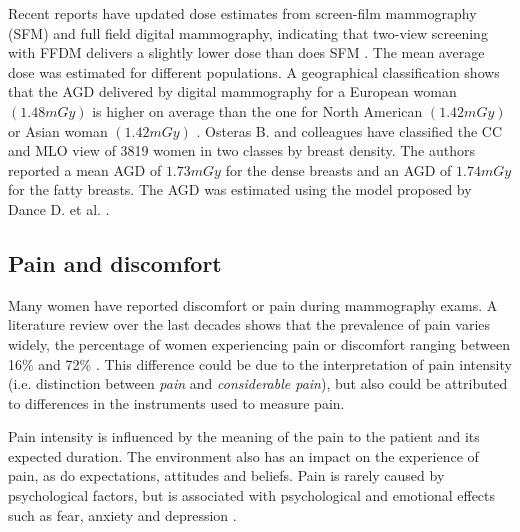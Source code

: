 Recent reports have updated dose estimates from screen-film mammography (SFM) and full field digital mammography, indicating that two-view screening with FFDM delivers a slightly lower dose than does SFM . The mean average dose was estimated for different populations. A geographical classification shows that the AGD delivered by digital mammography for a European woman  $(1.48 mGy)$ is higher on average than the one for North American $(1.42 mGy)$ or Asian woman $(1.42 mGy)$ \citep{geeraert_breast_2012}. Osteras B. and colleagues \cite{osteraas_average_2018} have classified the CC and MLO view of 3819 women in two classes by breast density. The authors reported a mean AGD of $1.73 mGy$ for the dense breasts and an AGD of $1.74 mGy$ for the fatty breasts. The AGD was estimated using the model proposed by Dance D. et al. \cite{dance_additional_2000} .  


\subsection{Pain and discomfort}
Many women have reported discomfort or pain during mammography exams. A literature review over the last decades shows that the  prevalence of pain varies widely, the percentage of women experiencing pain or discomfort ranging between 16\% and 72\% \citep{keemers_pain_2000, peipins_impact_2006,dullum_rates_2000, whelehan_effect_2013}. This difference could be due to the interpretation of pain intensity (i.e. distinction between \textit{pain} and \textit{considerable pain}),  but also could be attributed to differences in the instruments used to measure pain. 

Pain intensity is influenced by the meaning of the pain to the patient and its expected duration. The environment also has an impact on the experience of pain, as do expectations, attitudes and beliefs. Pain is rarely caused by psychological factors, but is associated with psychological and emotional effects such as fear, anxiety and
depression \citep{williamson_pain_2005}.

